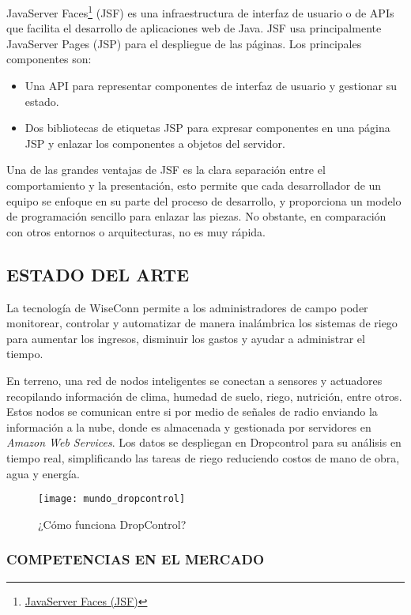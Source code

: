 
JavaServer Faces\footnote{\href{https://www.juntadeandalucia.es/servicios/madeja/contenido/recurso/101}{JavaServer Faces (JSF)}} (JSF) es una infraestructura de interfaz de usuario o de APIs que facilita el desarrollo de aplicaciones web de Java. JSF usa principalmente JavaServer Pages (JSP) para el despliegue de las páginas. Los principales componentes son:
\begin{itemize}
    \item Una API para representar componentes de interfaz de usuario y gestionar su estado.
    \item Dos bibliotecas de etiquetas JSP para expresar componentes en una página JSP y enlazar los componentes a objetos del servidor.
\end{itemize}
Una de las grandes ventajas de JSF es la clara separación entre el comportamiento y la presentación, esto permite que cada desarrollador de un equipo se enfoque en su parte del proceso de desarrollo, y proporciona un modelo de programación sencillo para enlazar las piezas. No obstante, en comparación con otros entornos o arquitecturas, no es muy rápida.

\subsection{ESTADO DEL ARTE}
La tecnología de WiseConn permite a los administradores de campo poder monitorear, controlar y automatizar de manera inalámbrica los sistemas de riego para aumentar los ingresos, disminuir los gastos y ayudar a administrar el tiempo.

En terreno, una red de nodos inteligentes se conectan a sensores y actuadores recopilando información de clima, humedad de suelo, riego, nutrición, entre otros. Estos nodos se comunican entre si por medio de señales de radio enviando la información a la nube, donde es almacenada y gestionada por servidores en \textit{Amazon Web Services}. Los datos se despliegan en Dropcontrol para su análisis en tiempo real, simplificando las tareas de riego reduciendo costos de mano de obra, agua y energía.
\begin{figure}[h]
	\centering
	\texttt{[image: mundo\_dropcontrol]}
	\caption{\label{fig:mundrop} ¿Cómo funciona DropControl?}
\end{figure}

\subsubsection{COMPETENCIAS EN EL MERCADO}

